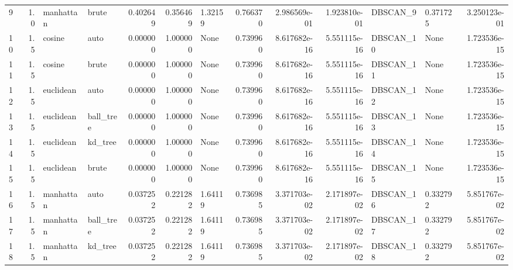 \begin{tabular}{lrllrrlrrrllr}
9  &  1.0 &  manhattan &      brute &             0.402649 &            0.356469 &              1.32159 &               0.766370 &       2.986569e-01 &       1.923810e-01 &   DBSCAN\_9 &         0.371725 &     3.250123e-01 \\
10 &  1.5 &     cosine &       auto &             0.000000 &            1.000000 &                 None &               0.739960 &       8.617682e-16 &       5.551115e-16 &  DBSCAN\_10 &             None &     1.723536e-15 \\
11 &  1.5 &     cosine &      brute &             0.000000 &            1.000000 &                 None &               0.739960 &       8.617682e-16 &       5.551115e-16 &  DBSCAN\_11 &             None &     1.723536e-15 \\
12 &  1.5 &  euclidean &       auto &             0.000000 &            1.000000 &                 None &               0.739960 &       8.617682e-16 &       5.551115e-16 &  DBSCAN\_12 &             None &     1.723536e-15 \\
13 &  1.5 &  euclidean &  ball\_tree &             0.000000 &            1.000000 &                 None &               0.739960 &       8.617682e-16 &       5.551115e-16 &  DBSCAN\_13 &             None &     1.723536e-15 \\
14 &  1.5 &  euclidean &    kd\_tree &             0.000000 &            1.000000 &                 None &               0.739960 &       8.617682e-16 &       5.551115e-16 &  DBSCAN\_14 &             None &     1.723536e-15 \\
15 &  1.5 &  euclidean &      brute &             0.000000 &            1.000000 &                 None &               0.739960 &       8.617682e-16 &       5.551115e-16 &  DBSCAN\_15 &             None &     1.723536e-15 \\
16 &  1.5 &  manhattan &       auto &             0.037252 &            0.221282 &              1.64119 &               0.736985 &       3.371703e-02 &       2.171897e-02 &  DBSCAN\_16 &         0.332792 &     5.851767e-02 \\
17 &  1.5 &  manhattan &  ball\_tree &             0.037252 &            0.221282 &              1.64119 &               0.736985 &       3.371703e-02 &       2.171897e-02 &  DBSCAN\_17 &         0.332792 &     5.851767e-02 \\
18 &  1.5 &  manhattan &    kd\_tree &             0.037252 &            0.221282 &              1.64119 &               0.736985 &       3.371703e-02 &       2.171897e-02 &  DBSCAN\_18 &         0.332792 &     5.851767e-02 \\

\end{tabular}
